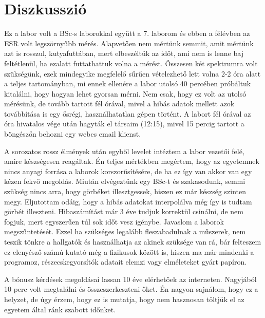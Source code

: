 \documentclass[12pt,a4paper]{article}
\theoremstyle{plain}
\begin{document}
\section{Diszkusszió}

\par Ez a labor volt a BSc-s laborokkal együtt a 7.
laborom és ebben a félévben az ESR volt  legszörnyűbb mérés.
Alapvetően nem mértünk semmit, amit mértünk azt is rosszul, kutyafuttában,
mert elbeszéltük az időt, ami nem is lenne baj feltétlenül, ha ezalatt futtathattuk volna a mérést.
Összesen két spektrumra volt szükségünk, ezek mindegyike megfelelő sűrűen vételezhető lett volna
2-2 óra alatt a teljes tartományban, mi ennek ellenére a labor utolsó 40 percében próbáltuk kitalálni, hogy 
hogyan lehet gyorsan mérni. Nem csak, hogy ez volt az utolsó mérésünk, de tovább tartott fél órával, mivel 
a hibás adatok mellett azok továbbítása is egy ősrégi, használhatatlan gépen történt. A labort fél órával az
óra hivatalos vége után hagyták el társaim (12:15), mivel 15 percig tartott a böngészőn behozni egy webes email
klienst. 

\par A sorozatos rossz élmények után egyből levelet intéztem a labor vezetői felé, amire készségesen reagáltak.
Én teljes mértékben megértem, hogy az egyetemnek nincs anyagi forrása a laborok korszorűsítésére, de ha ez így van
akkor van egy kézen fekvő megoldás. Miután elvégeztünk egy BSc-t és szakasodunk, semmi szükség nincs arra, hogy
görbéket illesztgessek, hiszen ez már készség szinten megy. Eljutottam odáig, hogy 
a hibás adatokat interpolálva még így is tudtam görbét illeszteni. Hibaszámítást már 3 éve tudjuk korrektül
csinálni, de nem fogjuk, mert egyszerűen túl sok időt vesz igénybe. Javaslom a laborok megszűntetését. Ezzel ha 
szükséges legalább fleszabadulnak a műszerek, nem teszik tönkre a hallgatók és használhatja az akinek szüksége van rá,
bár felteszem ez elenyésző számú kutató még a fizikusok között is, hiszen ma már mindenki a programoz, 
részecskegyorsítók adatait elemzi vagy elméleteket gyárt papíron.

\par A bónusz kérdések megoldásai lassan 10 éve elérhetőek az interneten.
Nagyjából 10 perc volt megtalálni és összeszerkeszteni őket. Én nagyon sajnálom, hogy ez a helyzet,
de úgy érzem, hogy ez is mutatja, hogy nem hasznosan töltjük el az egyetem által ránk szabott időnket.

\clearpage
\end{document}
